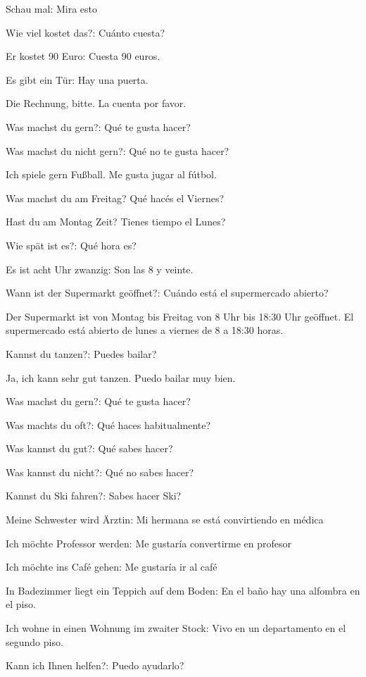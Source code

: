 \begin{myitemize}
\item Schau mal: Mira esto
\item Wie viel kostet das?: Cuánto cuesta?
\item Er kostet 90 Euro: Cuesta 90 euros.
\item Es gibt ein Tür: Hay una puerta.
\item Die Rechnung, bitte. La cuenta por favor.
\item Was machst du gern?: Qué te gusta hacer?
\item Was machst du nicht gern?: Qué no te gusta hacer? 
\item Ich spiele gern Fußball. Me gusta jugar al fútbol.
\item Was machst du am Freitag? Qué hacés el Viernes? 
\item Hast du am Montag Zeit? Tienes tiempo el Lunes? 
\item Wie spät ist es?: Qué hora es?
\item Es ist acht Uhr zwanzig: Son las 8 y veinte.
\item Wann ist der Supermarkt geöffnet?: Cuándo está el supermercado abierto?
\item Der Supermarkt ist von Montag bis Freitag von 8 Uhr bis 18:30 Uhr geöffnet. El supermercado está abierto de lunes a viernes de 8 a 18:30 horas.
\item Kannst du tanzen?: Puedes bailar?
\item Ja, ich kann sehr gut tanzen. Puedo bailar muy bien.
\item Was machst du gern?: Qué te gusta hacer?
\item Was machts du oft?: Qué haces habitualmente?
\item Was kannst du gut?: Qué sabes hacer?
\item Was kannst du nicht?: Qué no sabes hacer?
\item Kannst du Ski fahren?: Sabes hacer Ski?
\item Meine Schwester wird Ärztin: Mi hermana se está convirtiendo en médica
\item Ich möchte Professor werden: Me gustaría convertirme en profesor
\item Ich möchte ins Café gehen: Me gustaría ir al café
\item In Badezimmer liegt ein Teppich auf dem Boden: En el baño hay una alfombra en el piso.
\item Ich wohne in einen Wohnung im zwaiter Stock: Vivo en un departamento en el segundo piso.
\item Kann ich Ihnen helfen?: Puedo ayudarlo?

\end{myitemize}
